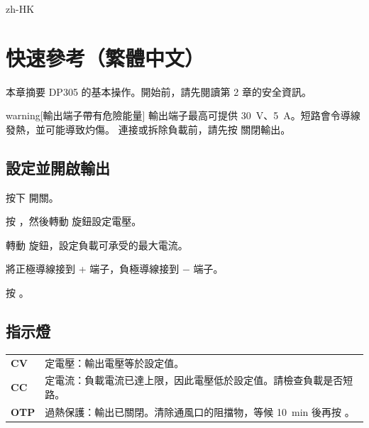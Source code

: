 \documentclass[type=manual, lang=en-GB, otherlangs={zh-HK}]{plaindoc}
\begin{document}
\begin{lang}{zh-HK}
\chapter{快速參考（繁體中文）}

本章摘要 DP305 的基本操作。開始前，請先閱讀第 2 章的安全資訊。

\begin{safety}{warning}[輸出端子帶有危險能量]
輸出端子最高可提供 \qty{30}{\volt}、\qty{5}{\ampere}。短路會令導線發熱，並可能導致灼傷。
連接或拆除負載前，請先按  關閉輸出。
\end{safety}

\section{設定並開啟輸出}

\begin{steps}
\item 按下  開關。
\item 按 ，然後轉動  旋鈕設定電壓。
\item 轉動  旋鈕，設定負載可承受的最大電流。
\item 將正極導線接到 + 端子，負極導線接到 − 端子。
\item 按 。
\end{steps}

\section{指示燈}

\begin{tabularx}{\linewidth}{@{}P{16mm}L@{}}
\toprule
{} &  \\
\midrule
\textbf{CV}  & 定電壓：輸出電壓等於設定值。 \\
\textbf{CC}  & 定電流：負載電流已達上限，因此電壓低於設定值。請檢查負載是否短路。 \\
\textbf{OTP} & 過熱保護：輸出已關閉。清除通風口的阻擋物，等候 \qty{10}{\minute} 後再按 。 \\
\bottomrule
\end{tabularx}
\end{lang}
\end{document}
